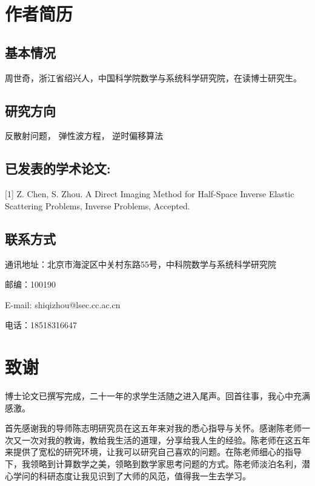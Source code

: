 \chapter{作者简历}



\section*{基本情况}


周世奇，浙江省绍兴人，中国科学院数学与系统科学研究院，在读博士研究生。

\section*{研究方向}

反散射问题， 弹性波方程， 逆时偏移算法


\section*{已发表的学术论文:}

[1] Z. Chen, S. Zhou. A Direct Imaging Method for Half-Space Inverse
Elastic Scattering Problems, Inverse Problems, Accepted.

\section*{联系方式}

通讯地址：北京市海淀区中关村东路55号，中科院数学与系统科学研究院

邮编：100190

E-mail: shiqizhou@lsec.cc.ac.cn

电话：18518316647

\chapter[致谢]{致\quad 谢}%
\thispagestyle{noheaderstyle}%
博士论文已撰写完成，二十一年的求学生活随之进入尾声。回首往事，我心中充满感激。%

首先感谢我的导师陈志明研究员在这五年来对我的悉心指导与关怀。感谢陈老师一次又一次对我的教诲，教给我生活的道理，分享给我人生的经验。陈老师在这五年来提供了宽松的研究环境，让我可以研究自己喜欢的问题。在陈老师细心的指导下，我领略到计算数学之美，领略到数学家思考问题的方式。陈老师淡泊名利，潜心学问的科研态度让我见识到了大师的风范，值得我一生去学习。


